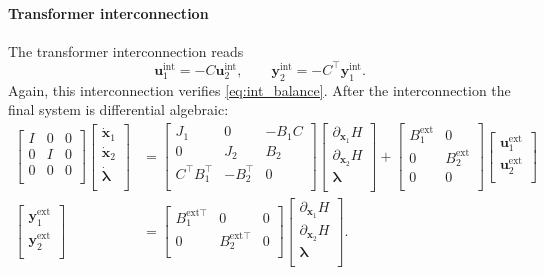 \paragraph{Transformer interconnection}
The transformer interconnection reads
\begin{equation*}
\bm{u}_1^{\text{int}} = - {C} \bm{u}_2^{\text{int}}, \qquad
\bm{y}_2^{\text{int}} = - {C}^\top \bm{y}_1^{\text{int}}.
\end{equation*}
Again, this interconnection verifies \eqref{eq:int_balance}. After the interconnection the final system is differential algebraic:
\begin{align*}
\begin{bmatrix}
I & 0 & 0 \\ 
0 & I & 0 \\
0 & 0 & 0 \\
\end{bmatrix}
\begin{bmatrix}
\dot{\bm{x}}_1 \\ \dot{\bm{x}}_2 \\ \dot{\bm{\lambda}} \\
\end{bmatrix} &= 
\begin{bmatrix}
J_1 & 0 & -B_1 C \\ 
0 & J_2 & B_2 \\
C^\top B_1^\top & - B_2^\top & 0 \\
\end{bmatrix}
\begin{bmatrix}
\partial_{\bm{x}_1}{H} \\ 
\partial_{\bm{x}_2}{H} \\
\bm{\lambda} \\
\end{bmatrix}+ 
\begin{bmatrix}
B_1^{\text{ext}} & 0 \\ 0 & B_2^{\text{ext}} \\ 0 & 0 \\
\end{bmatrix} 
\begin{bmatrix}
\bm{u}_1^{\text{ext}} \\ 
\bm{u}_2^{\text{ext}} \\
\end{bmatrix} \\
\begin{bmatrix}
\bm{y}_1^{\text{ext}} \\ \bm{y}_2^{\text{ext}} \\
\end{bmatrix}  &= \begin{bmatrix}
B_1^{\text{ext} \top} & 0 & 0 \\
0 & B_2^{\text{ext} \top} & 0 \\
\end{bmatrix} \begin{bmatrix}
\partial_{\bm{x}_1}{H} \\ 
\partial_{\bm{x}_2}{H} \\
\bm{\lambda} \\
\end{bmatrix}.
\end{align*}
